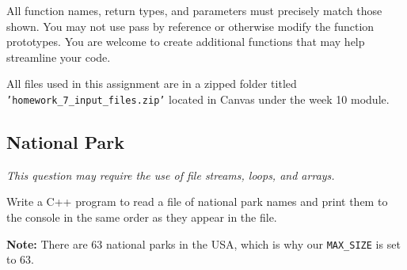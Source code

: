 All function names, return types, and parameters must precisely match those shown. You may not use pass by reference or otherwise modify the function prototypes. You are welcome to create additional functions that may help streamline your code. 

All files used in this assignment are in a zipped folder titled \texttt{'homework\_7\_input\_files.zip'} located in Canvas under the week 10 module.

\subsection{National Park} 
\textit{This question may require the use of file streams, loops, and arrays.} \newline

Write a C++ program to read a file of national park names and print them to the console in the same order as they appear in the file.

\textbf{Note:} There are 63 national parks in the USA, which is why our \texttt{MAX\_SIZE} is set to 63. \newline

